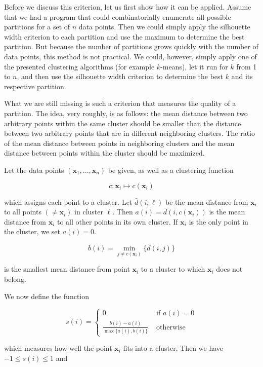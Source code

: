 \documentclass[10pt]{article}
\begin{document}
Before we discuss this criterion, let us first show how it can be applied. Assume that we had a program that could combinatorially enumerate all possible partitions for a set of $n$ data points. Then we could simply apply the silhouette width criterion to each partition and use the maximum to determine the best partition. But because the number of partitions grows quickly with the number of data points, this method is not practical. We could, however, simply apply one of the presented clustering algorithms (for example $k$-means), let it run for $k$ from 1 to $n$, and then use the silhouette width criterion to determine the best $k$ and its respective partition.

What we are still missing is such a criterion that measures the quality of a partition. The idea, very roughly, is as follows: the mean distance between two arbitrary points within the same cluster should be smaller than the distance between two arbitrary points that are in different neighboring clusters. The ratio of the mean distance between points in neighboring clusters and the mean distance between points within the cluster should be maximized.

Let the data points $\left(\boldsymbol{x}_{1}, \ldots, \boldsymbol{x}_{n}\right)$ be given, as well as a clustering function

$$
c: \boldsymbol{x}_{i} \mapsto c\left(\boldsymbol{x}_{i}\right)
$$

which assigns each point to a cluster. Let $\bar{d}(i, \ell)$ be the mean distance from $\boldsymbol{x}_{i}$ to all points $\left(\neq \boldsymbol{x}_{i}\right)$ in cluster $\ell$. Then $a(i)=\bar{d}\left(i, c\left(\boldsymbol{x}_{i}\right)\right)$ is the mean distance from $\boldsymbol{x}_{i}$ to all other points in its own cluster. If $\boldsymbol{x}_{i}$ is the only point in the cluster, we set $a(i)=0$.

$$
b(i)=\min _{j \neq c\left(\boldsymbol{x}_{i}\right)}\{\bar{d}(i, j)\}
$$

is the smallest mean distance from point $\boldsymbol{x}_{i}$ to a cluster to which $\boldsymbol{x}_{i}$ does not belong.

We now define the function

$$
s(i)=\left\{\begin{array}{cc}
0 & \text { if } a(i)=0 \\
\frac{b(i)-a(i)}{\max \{a(i), b(i)\}} & \text { otherwise }
\end{array}\right.
$$

which measures how well the point $\boldsymbol{x}_{i}$ fits into a cluster. Then we have $-1 \leq s(i) \leq 1$ and
\end{document}
